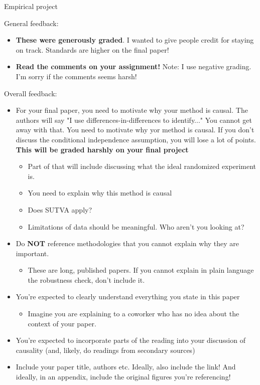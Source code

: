 \documentclass[compress, 8pt]{beamer}
\begin{document}
\begin{frame}{Empirical project}

    General feedback:
    \begin{itemize}
        \item \textbf{These were generously graded}. I wanted to give people credit for staying on track. Standards are higher on the final paper!
        \item \textbf{Read the comments on your assignment!} Note: I use negative grading. I'm sorry if the comments seems harsh! 
    \end{itemize}

Overall feedback: 
\begin{itemize}
    \item For your final paper, you need to motivate why your method is causal. The authors will say "I use differences-in-differences to identify..." You cannot get away with that. You need to motivate why yor method is causal. If you don't discuss the conditional independence assumption, you will lose a lot of points. \textbf{This will be graded harshly on your final project}
    
    \begin{itemize}
        \item Part of that will include discussing what the ideal randomized experiment is. 
        \item You need to explain why this method is causal
        \item Does SUTVA apply? 
        \item Limitations of data should be meaningful. Who aren't you looking at? 
    \end{itemize}

    \item Do \textbf{NOT} reference methodologies that you cannot explain why they are important. 

    \begin{itemize}
        \item These are long, published papers. If you cannot explain in plain language the robustness check, don't include it. 
    \end{itemize}

    \item You're expected to clearly understand everything you state in this paper
    \begin{itemize}
        \item Imagine you are explaining to a coworker who has no idea about the context of your paper. 
    \end{itemize}

    \item You're expected to incorporate parts of the reading into your discussion of causality (and, likely, do readings from secondary sources)
    \item Include your paper title, authors etc. Ideally, also include the link! And ideally, in an appendix, include the original figures you're referencing!
\end{itemize}

\end{frame}
\end{document}
